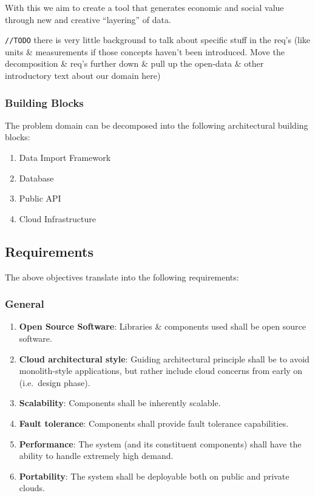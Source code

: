 With this we aim to create a tool that generates economic and social
value through new and creative ``layering'' of data.

\texttt{//TODO} there is very little background to talk about specific
stuff in the req's (like units \& measurements if those concepts haven't
been introduced. Move the decomposition \& req's further down \& pull up
the open-data \& other introductory text about our domain here)

\subsubsection{Building Blocks}\label{building-blocks}

The problem domain can be decomposed into the following architectural
building blocks:

\begin{enumerate}
\def\labelenumi{\arabic{enumi}.}
\tightlist
\item
  Data Import Framework
\item
  Database
\item
  Public API
\item
  Cloud Infrastructure
\end{enumerate}

\subsection{Requirements}\label{requirements}

The above objectives translate into the following requirements:

\subsubsection{General}\label{general}

\begin{enumerate}
\def\labelenumi{\arabic{enumi}.}
\tightlist
\item
  \textbf{Open Source Software}: Libraries \& components used shall be
  open source software.
\item
  \textbf{Cloud architectural style}: Guiding architectural principle
  shall be to avoid monolith-style applications, but rather include
  cloud concerns from early on (i.e.~design phase).
\item
  \textbf{Scalability}: Components shall be inherently scalable.
\item
  \textbf{Fault tolerance}: Components shall provide fault tolerance
  capabilities.
\item
  \textbf{Performance}: The system (and its constituent components)
  shall have the ability to handle extremely high demand.
\item
  \textbf{Portability}: The system shall be deployable both on public
  and private clouds.
\end{enumerate}


